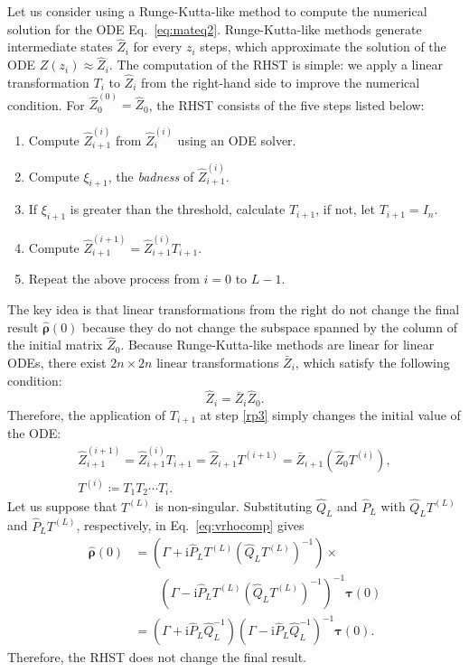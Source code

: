 \documentclass[preprint, 5p, times, sort&compress]{elsarticle}
\def\vtau{\bm{\tau}}
\def\vrho{\bm{\rho}}
\def\imag{\mathrm{i}}
\begin{document}
        Let us consider using a Runge-Kutta-like method to compute the numerical solution for the ODE Eq.~\eqref{eq:mateq2}.
        Runge-Kutta-like methods generate intermediate states $\hat{Z}_i$ for every $z_i$ steps, which approximate the solution of the ODE
        $Z(z_i) \approx \hat{Z}_i$.
        The computation of the RHST is simple: we apply a linear transformation $T_i$ to $\hat{Z}_i$ from the right-hand side
        to improve the numerical condition.
        For $\hat{Z}_0^{(0)} = \hat{Z}_0$, the RHST consists of the five steps listed below:
        \begin{enumerate}
                \item \label{rp1} Compute $\hat{Z}_{i+1}^{(i)}$ from $\hat{Z}_{i}^{(i)}$ using an ODE solver.
                \item \label{rp2} Compute $\xi_{i+1}$, the \emph{badness} of $\hat{Z}_{i+1}^{(i)}$.
                \item \label{rp3} If $\xi_{i+1}$ is greater than the threshold, calculate $T_{i+1}$, if not, let $T_{i+1}=I_n$.
                \item \label{rp4} Compute $\hat{Z}_{i+1}^{(i+1)} = \hat{Z}_{i+1}^{(i)} T_{i+1}$.
                \item Repeat the above process from $i=0$ to $L-1$.
        \end{enumerate}

        The key idea is that linear transformations from the right do not change the final result $\hat{\vrho}(0)$
        because they do not change the subspace spanned by the column of the initial matrix $\hat{Z}_0$.
        Because Runge-Kutta-like methods are linear for linear ODEs, there exist $2n\times 2n$ linear transformations $\bar{Z}_i$, which satisfy the following condition:
        \begin{equation}
                \hat{Z}_i = \bar{Z}_i \hat{Z}_0.
        \end{equation}
        Therefore, the application of $T_{i+1}$ at step \ref{rp3} simply changes the initial value of the ODE:
        \begin{multline}
                \hat{Z}_{i+1}^{(i+1)} = \hat{Z}_{i+1}^{(i)}T_{i+1} = \hat{Z}_{i+1}T^{(i+1)} = \bar{Z}_{i+1} \left(\hat{Z}_0 T^{(i)}\right),\\
                T^{(i)}\coloneqq T_1T_2\cdots T_{i}.
        \end{multline}
        Let us suppose that $T^{(L)}$ is non-singular. Substituting $\hat{Q}_L$ and $\hat{P}_L$
        with $\hat{Q}_LT^{(L)}$ and $\hat{P}_LT^{(L)}$, respectively,
        in Eq.~\eqref{eq:vrhocomp} gives
        \begin{align}
                \hat{\vrho}(0) &=
                \left(\Gamma+\imag \hat{P}_LT^{(L)}(\hat{Q}_LT^{(L)})^{-1}\right)\times {} \nonumber \\
                &{} \quad\quad \left(\Gamma-\imag \hat{P}_LT^{(L)}(\hat{Q}_LT^{(L)})^{-1}\right)^{-1} \vtau(0) \\
                &=
                \left(\Gamma+\imag \hat{P}_L\hat{Q}_L^{-1}\right)\left(\Gamma-\imag \hat{P}_L\hat{Q}_L^{-1}\right)^{-1} \vtau(0).
        \end{align}
        Therefore, the RHST does not change the final result.
\end{document}
